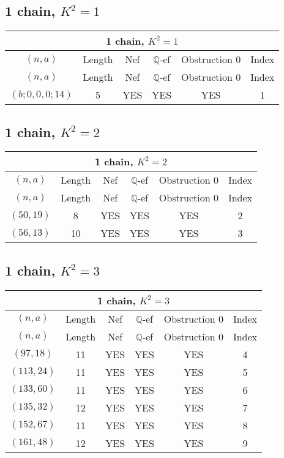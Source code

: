\subsection{1 chain, $K^2 = 1$}
\begin{longtable}{|c|c|c|c|c|c|}
\hline
\multicolumn{6}{|c|}{1 chain, $K^2 = 1$}\\
\hline
$(n,a)$ & Length & Nef & $\mathbb Q$-ef & Obstruction 0 & Index\\
\hline
\endfirsthead

\hline
$(n,a)$ & Length & Nef & $\mathbb Q$-ef & Obstruction 0 & Index\\
\hline
\endhead
\hline
\endfoot

$(b; 0, 0, 0; 14)$ & 5 & YES & YES & YES & 1
\end{longtable}
\subsection{1 chain, $K^2 = 2$}
\begin{longtable}{|c|c|c|c|c|c|}
\hline
\multicolumn{6}{|c|}{1 chain, $K^2 = 2$}\\
\hline
$(n,a)$ & Length & Nef & $\mathbb Q$-ef & Obstruction 0 & Index\\
\hline
\endfirsthead

\hline
$(n,a)$ & Length & Nef & $\mathbb Q$-ef & Obstruction 0 & Index\\
\hline
\endhead
\hline
\endfoot

$(50, 19)$ & 8 & YES & YES & YES & 2\\
$(56, 13)$ & 10 & YES & YES & YES & 3
\end{longtable}
\subsection{1 chain, $K^2 = 3$}
\begin{longtable}{|c|c|c|c|c|c|}
\hline
\multicolumn{6}{|c|}{1 chain, $K^2 = 3$}\\
\hline
$(n,a)$ & Length & Nef & $\mathbb Q$-ef & Obstruction 0 & Index\\
\hline
\endfirsthead

\hline
$(n,a)$ & Length & Nef & $\mathbb Q$-ef & Obstruction 0 & Index\\
\hline
\endhead
\hline
\endfoot

$(97, 18)$ & 11 & YES & YES & YES & 4\\
$(113, 24)$ & 11 & YES & YES & YES & 5\\
$(133, 60)$ & 11 & YES & YES & YES & 6\\
$(135, 32)$ & 12 & YES & YES & YES & 7\\
$(152, 67)$ & 11 & YES & YES & YES & 8\\
$(161, 48)$ & 12 & YES & YES & YES & 9
\end{longtable}
